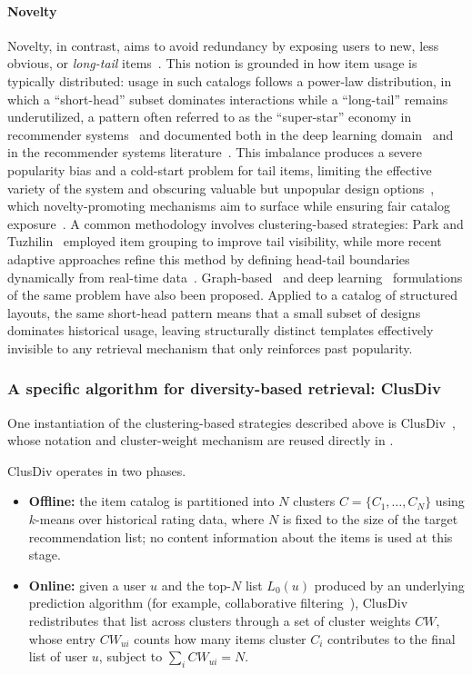 \paragraph*{Novelty}
Novelty, in contrast, aims to avoid redundancy by exposing users to new, less obvious, or \emph{long-tail} items~\cite{clarke-2008, wu-survey-2022}. This notion is grounded in how item usage is typically distributed: usage in such catalogs follows a power-law distribution, in which a ``short-head'' subset dominates interactions while a ``long-tail'' remains underutilized, a pattern often referred to as the ``super-star'' economy in recommender systems~\cite{wu-survey-2022} and documented both in the deep learning domain~\cite{longtail-deep} and in the recommender systems literature~\cite{longtail}. This imbalance produces a severe popularity bias and a cold-start problem for tail items, limiting the effective variety of the system and obscuring valuable but unpopular design options~\cite{longtail}, which novelty-promoting mechanisms aim to surface while ensuring fair catalog exposure~\cite{wu-survey-2022}. A common methodology involves clustering-based strategies: Park and Tuzhilin~\cite{long-tail-ei-tc} employed item grouping to improve tail visibility, while more recent adaptive approaches refine this method by defining head-tail boundaries dynamically from real-time data~\cite{longtail-clustering-based}. Graph-based~\cite{graphmethod-1, graphmethod-2, graphmethod-3} and deep learning~\cite{dl-1, dl-2, dl-3, dl-4} formulations of the same problem have also been proposed. Applied to a catalog of structured layouts, the same short-head pattern means that a small subset of designs dominates historical usage, leaving structurally distinct templates effectively invisible to any retrieval mechanism that only reinforces past popularity.

\subsubsection{A specific algorithm for diversity-based retrieval: ClusDiv}
\label{sec:sota-clusdiv}


One instantiation of the clustering-based strategies described above is ClusDiv~\cite{clusdiv}, whose notation and cluster-weight mechanism are reused directly in .

ClusDiv operates in two phases. 
\begin{itemize}
    \item \textbf{Offline: }the item catalog is partitioned into $N$ clusters $C = \{C_1, \dots, C_N\}$ using $k$-means over historical rating data, where $N$ is fixed to the size of the target recommendation list; no content information about the items is used at this stage.
    \item \textbf{Online: }given a user $u$ and the top-$N$ list $L_0(u)$ produced by an underlying prediction algorithm (for example, collaborative filtering~\cite{cf-techniques}), ClusDiv redistributes that list across clusters through a set of cluster weights $CW$, whose entry $CW_{ui}$ counts how many items cluster $C_i$ contributes to the final list of user $u$, subject to $\sum_i CW_{ui} = N$.
\end{itemize}

